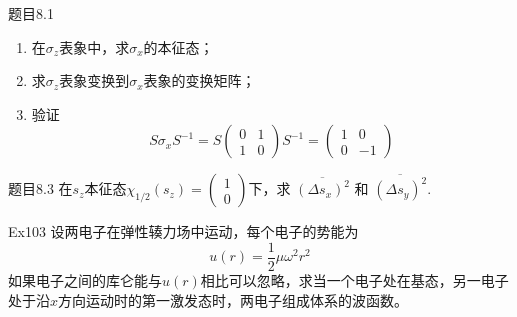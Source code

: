 \begin{question}{题目8.1}
    \begin{enumerate}
        \item 在$\sigma_z$表象中，求$\sigma_x$的本征态；
        \item 求$\sigma_z$表象变换到$\sigma_x$表象的变换矩阵；
        \item 验证
              $$
                  S\sigma_xS^{-1} = S\begin{pmatrix} 0 & 1 \\ 1 & 0 \end{pmatrix}S^{-1}=\begin{pmatrix} 1 & 0 \\ 0 & -1 \end{pmatrix}
              $$
    \end{enumerate}
\end{question}
\begin{solution}
\end{solution}



\begin{question}{题目8.3}
    在$s_z$本征态$\chi_{1/2}(s_z)=\begin{pmatrix} 1 \\ 0 \end{pmatrix}$下，求 $\overline{(\Delta{s_x})^2}$ 和 $\overline{(\Delta{s_y})^2}$.
\end{question}
\begin{solution}

\end{solution}



\begin{question}{Ex103}
    设两电子在弹性辏力场中运动，每个电子的势能为
    $$
        u(r)=\frac{1}{2}\mu\omega^2r^2
    $$
    如果电子之间的库仑能与$u(r)$相比可以忽略，求当一个电子处在基态，另一电子处于沿$x$方向运动时的第一激发态时，两电子组成体系的波函数。
\end{question}
\begin{solution}
\end{solution}





